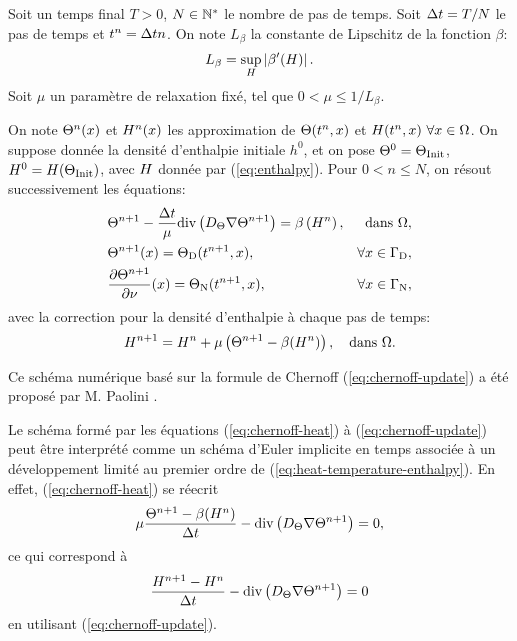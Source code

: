 Soit un temps final $T > 0$, $N\in \mathbb {\mathbb N^*}$ le nombre de pas de
temps. Soit $\Delta t = T / N$ le pas de temps et $t^n = \Delta t n$. On note
$L_\beta$ la constante de Lipschitz de la fonction $\beta$:
\begin{equation}
  L_\beta = \sup_{H}\left\lvert \beta'(H) \right\rvert.
\end{equation}
Soit $\mu$ un paramètre de relaxation fixé, tel que $0 < \mu \leq
1/L_\beta$.

On note $\Theta^n(x)$ et $H^n(x)$ les approximation
de $\Theta(t^n, x)$ et $H(t^n, x)\ \forall x\in
\Omega$.  On suppose donnée la densité d'enthalpie initiale $h^0$, et
on pose $\Theta^0 = \Theta_\text{Init}$, $H^0 = H(\Theta_\text{Init})$,
avec $H$ donnée par (\ref{eq:enthalpy}). Pour $0 < n \leq N$, on résout
successivement les équations:
\begin{align}
  &\temperature^{n+1} - \frac{\timestep}{\mu} \div\parent{
    \electrolytetdiff \nabla\temperature^{n+1}} = %
  \beta\parent{\enthalpydensity^n}, & \text{dans } \Omega,\label{eq:chernoff-heat}\\
  &\temperature^{n+1}(x) = \temperature_{\mathrm D}(t^{n+1}, x), &
  \forall x\in%
  \Gamma_\mathrm{D},\label{eq:chernoff-dirichlet}\\
  &\frac{\partial\temperature^{n+1}}{\partial \nu}(x) = %
  \temperature_\mathrm{N}(t^{n+1}, x), %
  & \forall x \in \Gamma_\mathrm{N},\label{eq:chernoff-neumann}
\end{align}
avec la correction pour la densité d'enthalpie à chaque pas de temps:
\begin{equation}\label{eq:chernoff-update}
H^{n+1} = H^{n} +
\mu\left( \Theta^{n+1} - \beta(H^{n}) \right), \quad
\text{dans } \Omega.
\end{equation}

Ce schéma numérique basé sur la formule de Chernoff
(\ref{eq:chernoff-update}) a été proposé par M. Paolini
\cite{Paolini1988}.

\begin{remarque}
  Le schéma formé par les équations (\ref{eq:chernoff-heat}) à
  (\ref{eq:chernoff-update}) peut être interprété comme un
  schéma d'Euler implicite en temps associée à un développement
  limité au premier ordre de (\ref{eq:heat-temperature-enthalpy}). En
  effet, (\ref{eq:chernoff-heat}) se réecrit
  \begin{equation}
    \mu \frac{\Theta^{n+1} - \beta(H^n)}{\Delta t} -
    \mathrm{div}\left( D_\Theta \nabla \Theta^{n+1} \right) = 0,
  \end{equation}
  ce qui correspond à
  \begin{equation}
    \frac{H^{n+1} - H^n}{\Delta t} -
    \mathrm{div}\left( D_\Theta \nabla \Theta^{n+1} \right) = 0
  \end{equation}
  en utilisant (\ref{eq:chernoff-update}).
\end{remarque}

